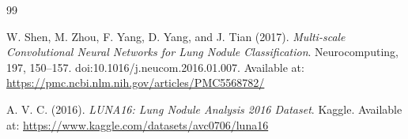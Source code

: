 \documentclass[a4paper, 10pt, twocolumn]{article}
\begin{document}
\begin{thebibliography}{99}

W. Shen, M. Zhou, F. Yang, D. Yang, and J. Tian (2017). 
\textit{Multi-scale Convolutional Neural Networks for Lung Nodule Classification}. 
Neurocomputing, 197, 150--157. 
doi:10.1016/j.neucom.2016.01.007. 
Available at: \url{https://pmc.ncbi.nlm.nih.gov/articles/PMC5568782/}

A. V. C. (2016). 
\textit{LUNA16: Lung Nodule Analysis 2016 Dataset}. 
Kaggle. Available at: \url{https://www.kaggle.com/datasets/avc0706/luna16}

\end{thebibliography}

 
\maketitle 
\end{document}
